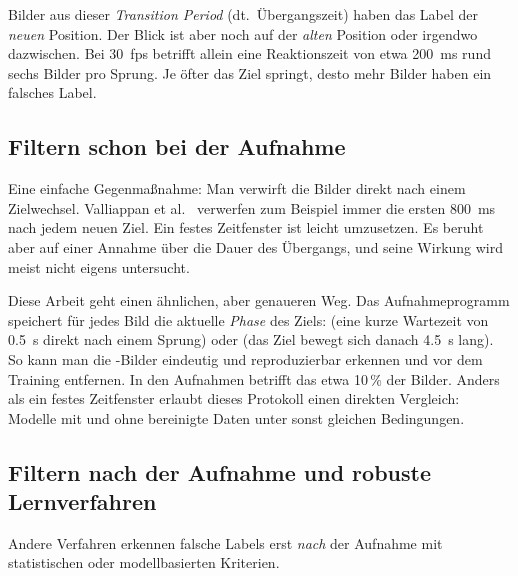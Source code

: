 Bilder aus dieser \emph{Transition Period} (dt.\ Übergangszeit) haben das
Label der \emph{neuen} Position. Der
Blick ist aber noch auf der \emph{alten} Position oder irgendwo dazwischen. Bei
\SI{30}{fps} betrifft allein eine Reaktionszeit von etwa
\SI{200}{\milli\second} rund sechs Bilder pro Sprung. Je öfter das Ziel
springt, desto mehr Bilder haben ein falsches Label.

\subsection{Filtern schon bei der Aufnahme}
\label{subsec:phase_logging}
Eine einfache Gegenmaßnahme: Man verwirft die Bilder direkt nach einem
Zielwechsel. Valliappan et al.~\cite{valliappan2020smartphone} verwerfen zum
Beispiel immer die ersten \SI{800}{\milli\second} nach jedem neuen Ziel. Ein
festes Zeitfenster ist leicht umzusetzen. Es beruht aber auf einer Annahme über
die Dauer des Übergangs, und seine Wirkung wird meist nicht eigens untersucht.

Diese Arbeit geht einen ähnlichen, aber genaueren Weg. Das Aufnahmeprogramm
speichert für jedes Bild die aktuelle \emph{Phase} des Ziels:  (eine
kurze Wartezeit von \SI{0,5}{\second} direkt nach einem Sprung) oder
 (das Ziel bewegt sich danach \SI{4,5}{\second} lang). So kann man
die -Bilder eindeutig und reproduzierbar erkennen und vor dem
Training entfernen. In den Aufnahmen betrifft das etwa 10\,\% der Bilder.
Anders als ein festes Zeitfenster erlaubt dieses Protokoll einen direkten
Vergleich: Modelle mit und ohne bereinigte Daten unter sonst gleichen
Bedingungen.

\subsection{Filtern nach der Aufnahme und robuste Lernverfahren}
\label{subsec:dmrf}
Andere Verfahren erkennen falsche Labels erst \emph{nach} der Aufnahme mit
statistischen oder modellbasierten Kriterien.

